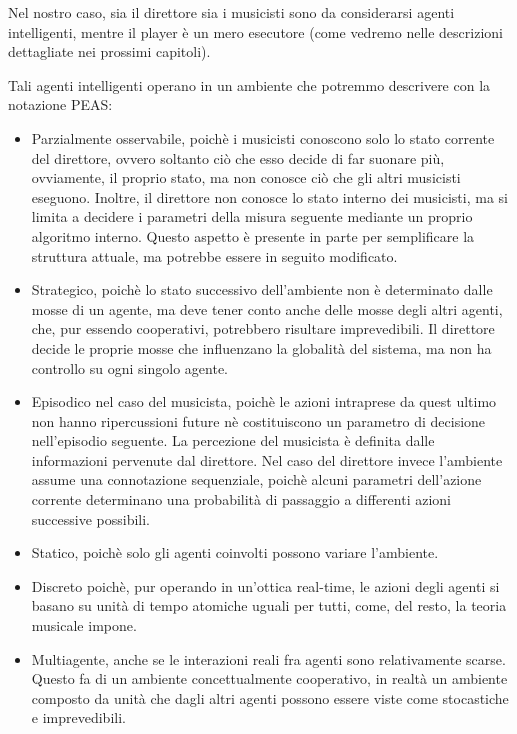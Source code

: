 Nel nostro caso, sia il direttore sia i musicisti sono da considerarsi agenti intelligenti, mentre il player è un mero esecutore (come vedremo nelle descrizioni dettagliate nei prossimi capitoli).

Tali agenti intelligenti operano in un ambiente che potremmo descrivere con la notazione PEAS:
\begin{itemize}
 \item Parzialmente osservabile, poichè i musicisti conoscono solo lo stato corrente del direttore, ovvero soltanto ciò che esso decide di far suonare più, ovviamente, il proprio stato, ma non conosce ciò che gli altri musicisti eseguono.
 Inoltre, il direttore non conosce lo stato interno dei musicisti, ma si limita a decidere i parametri della misura seguente mediante un proprio algoritmo interno.
 Questo aspetto è presente in parte per semplificare la struttura attuale, ma potrebbe essere in seguito modificato.
 \item Strategico, poichè lo stato successivo dell'ambiente non è determinato dalle mosse di un agente, ma deve tener conto anche delle mosse degli altri agenti, che, pur essendo cooperativi, potrebbero risultare imprevedibili.
 Il direttore decide le proprie mosse che influenzano la globalità del sistema, ma non ha controllo su ogni singolo agente.
 \item Episodico nel caso del musicista, poichè le azioni intraprese da quest ultimo non hanno ripercussioni future nè costituiscono un parametro di decisione nell'episodio seguente.
 La percezione del musicista è definita dalle informazioni pervenute dal direttore.
 Nel caso del direttore invece l'ambiente assume una connotazione sequenziale, poichè alcuni parametri dell'azione corrente determinano una probabilità di passaggio a differenti azioni successive possibili.
 \item Statico, poichè solo gli agenti coinvolti possono variare l'ambiente.
 \item Discreto poichè, pur operando in un'ottica real-time, le azioni degli agenti si basano su unità di tempo atomiche uguali per tutti, come, del resto, la teoria musicale impone.
 \item Multiagente, anche se le interazioni reali fra agenti sono relativamente scarse. Questo fa di un ambiente concettualmente cooperativo, in realtà un ambiente composto da unità che dagli altri agenti possono essere viste come stocastiche e imprevedibili.
 \end{itemize}

